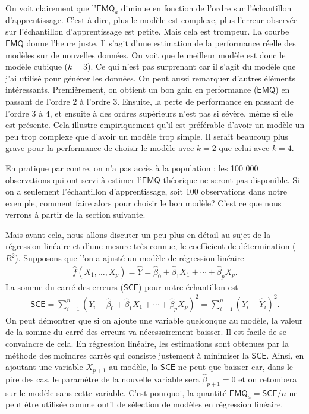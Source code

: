 \documentclass[
]{book}
\theoremstyle{definition}
\theoremstyle{definition}
\theoremstyle{definition}
\theoremstyle{remark}
\begin{document}
On voit clairement que l'\(\mathsf{EMQ}_a\) diminue en fonction de l'ordre sur l'échantillon d'apprentissage. C'est-à-dire, plus le modèle est complexe, plus l'erreur observée sur l'échantillon d'apprentissage est petite. Mais cela est trompeur. La courbe \(\mathsf{EMQ}\) donne l'heure juste. Il s'agit d'une estimation de la performance réelle des modèles sur de nouvelles données. On voit que le meilleur modèle est donc le modèle cubique (\(k=3\)). Ce qui n'est pas surprenant car il s'agit du modèle que j'ai utilisé pour générer les données. On peut aussi remarquer d'autres éléments intéressants. Premièrement, on obtient un bon gain en performance (\(\mathsf{EMQ}\)) en passant de l'ordre \(2\) à l'ordre \(3\). Ensuite, la perte de performance en passant de l'ordre \(3\) à \(4\), et ensuite à des ordres supérieurs n'est pas si sévère, même si elle est présente. Cela illustre empiriquement qu'il est préférable d'avoir un modèle un peu trop complexe que d'avoir un modèle trop simple. Il serait beaucoup plus grave pour la performance de choisir le modèle avec \(k=2\) que celui avec \(k=4\).

En pratique par contre, on n'a pas accès à la population : les 100 000 observations qui ont servi à estimer l'\(\mathsf{EMQ}\) théorique ne seront pas disponible. Si on a seulement l'échantillon d'apprentissage, soit 100 observations dans notre exemple, comment faire alors pour choisir le bon modèle? C'est ce que nous verrons à partir de la section suivante.

Mais avant cela, nous allons discuter un peu plus en détail au sujet de la régression linéaire et d'une mesure très connue, le coefficient de détermination (\(R^2\)). Supposons que l'on a ajusté un modèle de régression linéaire
\begin{align*}
\widehat{f}(X_1, \ldots, X_p) = \widehat{Y}=\widehat{\beta}_0 + \widehat{\beta}_1X_1+ \cdots + \widehat{\beta}_p X_p.
\end{align*}
La somme du carré des erreurs (\(\mathsf{SCE}\)) pour notre échantillon est
\begin{align*}
\mathsf{SCE}=\sum_{i=1}^n (Y_i - \widehat{\beta}_0 + \widehat{\beta}_1X_1+ \cdots + \widehat{\beta}_p X_p)^2 = \sum_{i=1}^n (Y_i-\widehat{Y}_i)^2.
 \end{align*}
On peut démontrer que si on ajoute une variable quelconque au modèle, la valeur de la somme du carré des erreurs va nécessairement baisser. Il est facile de se convaincre de cela. En régression linéaire, les estimations sont obtenues par la méthode des moindres carrés qui consiste justement à minimiser la \(\mathsf{SCE}\). Ainsi, en ajoutant une variable \(X_{p+1}\) au modèle, la \(\mathsf{SCE}\) ne peut que baisser car, dans le pire des cas, le paramètre de la nouvelle variable sera \(\widehat{\beta}_{p+1}=0\) et on retombera sur le modèle sans cette variable. C'est pourquoi, la quantité \(\mathsf{EMQ}_a=\mathsf{SCE}/n\) ne peut être utilisée comme outil de sélection de modèles en régression linéaire.
\end{document}
